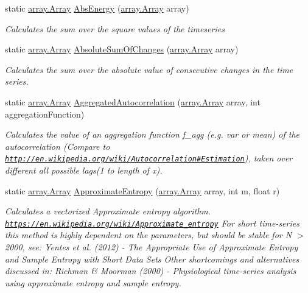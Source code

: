\begin{DoxyCompactItemize}
\item 
static \mbox{\hyperlink{classkhiva_1_1array_1_1_array}{array.\+Array}} \mbox{\hyperlink{classkhiva_1_1features_1_1_features_a94a5f3acdf3070a1874035df485f9491}{Abs\+Energy}} (\mbox{\hyperlink{classkhiva_1_1array_1_1_array}{array.\+Array}} array)
\begin{DoxyCompactList}\small\item\em Calculates the sum over the square values of the timeseries \end{DoxyCompactList}\item 
static \mbox{\hyperlink{classkhiva_1_1array_1_1_array}{array.\+Array}} \mbox{\hyperlink{classkhiva_1_1features_1_1_features_a0084451068ce2f104b7075350aad9eba}{Absolute\+Sum\+Of\+Changes}} (\mbox{\hyperlink{classkhiva_1_1array_1_1_array}{array.\+Array}} array)
\begin{DoxyCompactList}\small\item\em Calculates the sum over the absolute value of consecutive changes in the time series. \end{DoxyCompactList}\item 
static \mbox{\hyperlink{classkhiva_1_1array_1_1_array}{array.\+Array}} \mbox{\hyperlink{classkhiva_1_1features_1_1_features_a5caed649747363b05e0311d7d6d1e68d}{Aggregated\+Autocorrelation}} (\mbox{\hyperlink{classkhiva_1_1array_1_1_array}{array.\+Array}} array, int aggregation\+Function)
\begin{DoxyCompactList}\small\item\em Calculates the value of an aggregation function f\+\_\+agg (e.\+g. var or mean) of the autocorrelation (Compare to \href{http://en.wikipedia.org/wiki/Autocorrelation#Estimation}{\tt http\+://en.\+wikipedia.\+org/wiki/\+Autocorrelation\#\+Estimation}), taken over different all possible lags(1 to length of x).\end{DoxyCompactList}\item 
static \mbox{\hyperlink{classkhiva_1_1array_1_1_array}{array.\+Array}} \mbox{\hyperlink{classkhiva_1_1features_1_1_features_aa9e69b44583edf0ecad24b02910c228f}{Approximate\+Entropy}} (\mbox{\hyperlink{classkhiva_1_1array_1_1_array}{array.\+Array}} array, int m, float r)
\begin{DoxyCompactList}\small\item\em Calculates a vectorized Approximate entropy algorithm. \href{https://en.wikipedia.org/wiki/Approximate_entropy}{\tt https\+://en.\+wikipedia.\+org/wiki/\+Approximate\+\_\+entropy} For short time-\/series this method is highly dependent on the parameters, but should be stable for N $>$ 2000, see\+: Yentes et al. (2012) -\/ The Appropriate Use of Approximate Entropy and Sample Entropy with Short Data Sets Other shortcomings and alternatives discussed in\+: Richman \& Moorman (2000) -\/ Physiological time-\/series analysis using approximate entropy and sample entropy. \end{DoxyCompactList}\item 

\end{DoxyCompactItemize}
